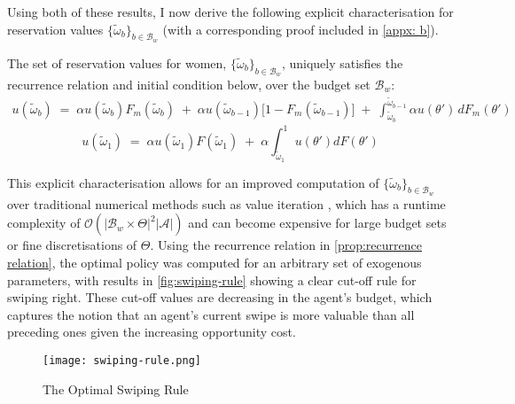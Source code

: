 Using both of these results, I now derive the following explicit characterisation for reservation values $\{\widetilde\omega_b\}_{b\in \mathcal{B}_w}$ (with a corresponding proof included in \autoref{appx: b}). 
\begin{proposition}\label{prop:recurrence relation}
The set of reservation values for women, $\{\widetilde\omega_b\}_{b\in \mathcal{B}_w}$, uniquely satisfies the recurrence relation and initial condition below, over the budget set $\mathcal{B}_w$: 
\begin{equation}\label{eq:recurrence relation}
    \begin{aligned}
        u(\widetilde \omega_b) \;=\; \alpha u(\widetilde \omega_b) F_m(\widetilde \omega_b) \;+\; \alpha u(\widetilde \omega_{b-1}) \Big[1- F_m(\widetilde \omega_{b-1})\Big] \;+\; \int^{\widetilde \omega_{b-1}}_{\widetilde \omega_b} \alpha u(\theta')\,dF_m(\theta')
    \end{aligned} 
\end{equation}  
\begin{equation}\label{eq:initial condition}
    u(\widetilde\omega_1) \;=\; \alpha u(\widetilde\omega_1)F(\widetilde\omega_1) \;+\; \alpha \int^1_{\widetilde\omega_1}u(\theta')dF(\theta')
\end{equation}
\end{proposition}  

This explicit characterisation allows for an improved computation of $\{\widetilde\omega_b\}_{b\in \mathcal{B}_w}$ over traditional numerical methods such as value iteration \citep{bellman2015applied}, which has a runtime complexity of $\mathcal{O}(|\mathcal{B}_w\times\Theta|^2|\mathcal{A}|)$ and can become expensive for large budget sets or fine discretisations of $\Theta$. Using the recurrence relation in \autoref{prop:recurrence relation}, the optimal policy was computed for an arbitrary set of exogenous parameters, with results in \autoref{fig:swiping-rule} showing a clear cut-off rule for swiping right. 
These cut-off values are decreasing in the agent's budget, which captures the notion that an agent's current swipe is more valuable than all preceding ones given the increasing opportunity cost.

\begin{figure}[ht]
    \centering
    \caption{The Optimal Swiping Rule}
    \texttt{[image: swiping-rule.png]}
    \label{fig:swiping-rule} 
\end{figure} 